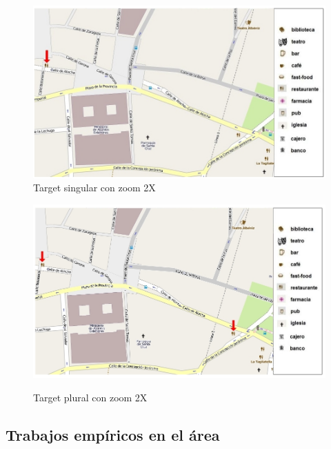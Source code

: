\begin{figure}
\begin{minipage}[b]{0.5\linewidth}
\centering
\includegraphics[width=\textwidth]{figures/rest-singular2x.png}\\[0pt]
\caption{Target singular con zoom 2X}
\label{rest-singular2x}
\end{minipage}
\vspace*{.1cm}
\begin{minipage}[b]{0.5\linewidth}
\centering
\includegraphics[width=\textwidth]{figures/rest-plural2x.png}\\[0pt]
\caption{Target plural con zoom 2X}
\label{rest-plural2x}
\end{minipage}
\end{figure}





\subsection{Trabajos emp\'iricos en el \'area}
\label{sec:trab_emp}

